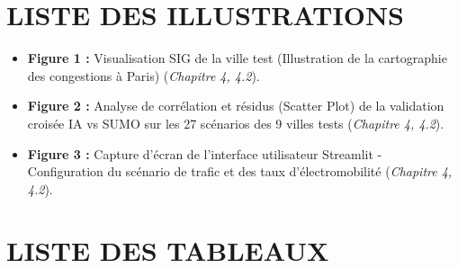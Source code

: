\documentclass[10pt, a4paper]{article}
\providecommand{\tightlist}{}
\begin{document}
\newpage

\section{LISTE DES ILLUSTRATIONS}\label{liste-des-illustrations}

\begin{itemize}
\tightlist
\item
  \textbf{Figure 1 :} Visualisation SIG de la ville test (Illustration
  de la cartographie des congestions à Paris) (\emph{Chapitre 4, 4.2}).
\item
  \textbf{Figure 2 :} Analyse de corrélation et résidus (Scatter Plot)
  de la validation croisée IA vs SUMO sur les 27 scénarios des 9 villes
  tests (\emph{Chapitre 4, 4.2}).
\item
  \textbf{Figure 3 :} Capture d'écran de l'interface utilisateur
  Streamlit - Configuration du scénario de trafic et des taux
  d'électromobilité (\emph{Chapitre 4, 4.2}).
\end{itemize}

\newpage

\section{LISTE DES TABLEAUX}\label{liste-des-tableaux}
\end{document}
